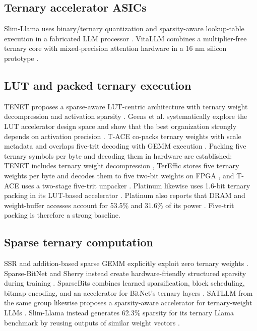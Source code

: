\documentclass[11pt]{article}
\begin{document}
\subsection{Ternary accelerator ASICs}

Slim-Llama uses binary/ternary quantization and sparsity-aware lookup-table execution in a fabricated LLM processor \cite{kim2025slimllama}. VitaLLM combines a multiplier-free ternary core with mixed-precision attention hardware in a 16 nm silicon prototype \cite{lin2026vitallm}.

\subsection{LUT and packed ternary execution}

TENET proposes a sparse-aware LUT-centric architecture with ternary weight decompression and activation sparsity \cite{huang2025tenet}. Geens et al. systematically explore the LUT accelerator design space and show that the best organization strongly depends on activation precision \cite{geens2026lut}. T-ACE co-packs ternary weights with scale metadata and overlaps five-trit decoding with GEMM execution \cite{jung2026tace}. Packing five ternary symbols per byte and decoding them in hardware are established: TENET includes ternary weight decompression \cite{huang2025tenet}, TerEffic stores five ternary weights per byte and decodes them to five two-bit weights on FPGA \cite{yin2025tereffic}, and T-ACE uses a two-stage five-trit unpacker \cite{jung2026tace}. Platinum likewise uses 1.6-bit ternary packing in its LUT-based accelerator \cite{shan2026platinum}. Platinum also reports that DRAM and weight-buffer accesses account for 53.5\% and 31.6\% of its power \cite{shan2026platinum}. Five-trit packing is therefore a strong baseline.

\subsection{Sparse ternary computation}

SSR and addition-based sparse GEMM explicitly exploit zero ternary weights \cite{pittet2026ssr,zhu2026sparsegemm}. Sparse-BitNet and Sherry instead create hardware-friendly structured sparsity during training \cite{zhang2026sparsebitnet,huang2026sherry}. SparseBits combines learned sparsification, block scheduling, bitmap encoding, and an accelerator for BitNet's ternary layers \cite{song2026sparsebits}. SATLLM from the same group likewise proposes a sparsity-aware accelerator for ternary-weight LLMs \cite{liu2026satllm}. Slim-Llama instead generates 62.3\% sparsity for its ternary Llama benchmark by reusing outputs of similar weight vectors \cite{kim2025slimllamahc}.
\end{document}
